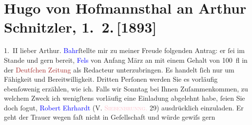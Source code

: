

               \section[Hugo von Hofmannsthal an Arthur Schnitzler, 1. 2. {[}1893{]}]{ Hugo von Hofmannsthal an Arthur Schnitzler, 1. 2. {[}1893{]}}\nopagebreak{}\rehead{ }\normalsize\beginnumbering{} \toendnotes[C]{\smallbreak\pagebreak[2]} 
\pstart
           \raggedleft{}{\pb}1. II\pend
           \pstart{}lieber Arthur.\pend\pstart
           \textcolor{blue}{Bahr}{}\ledrightnote{\textcolor{blue}{Hermann Bahr}}{ }ſtellte mir zu meiner Freude folgenden
                    Antrag: er ſei im Stande und gern bereit, \textcolor{blue}{Fels}{}\ledrightnote{\textcolor{blue}{Friedrich Michael Fels}} von Anfang März an mit einem Gehalt von 100 fl in
                    der \textcolor{brown}{Deutſchen Zeitung}{}\ledrightnote{\textcolor{brown}{Deutsche Zeitung}} als Redacteur
                    unterzubringen. Es handelt ſich nur um Fähigkeit und Bereitwilligkeit. Dritten
                    Perſonen werden Sie es vorläufig ebenſowenig erzählen, wie ich.\pend
           \pstart
           Falls wir Sonntag bei Ihnen Zuſammenkommen, zu welchem {\pb}Zweck ich wenigſtens
                    vorläufig eine Einladung abgelehnt habe, ſeien Sie doch ſogut, \textcolor{blue}{Robert Ehrhardt}{}\ledrightnote{\textcolor{blue}{Robert Ehrhart von Ehrhartstein}} (\textsc{V. \textcolor{pink}{Siebenbrunng.}{}\ledrightnote{\textcolor{pink}{Siebenbrunnengasse}} 29}) ausdrücklich einzuladen. Er
                    geht der Trauer wegen faſt nicht in Geſellschaft und würde gewiſs gern
